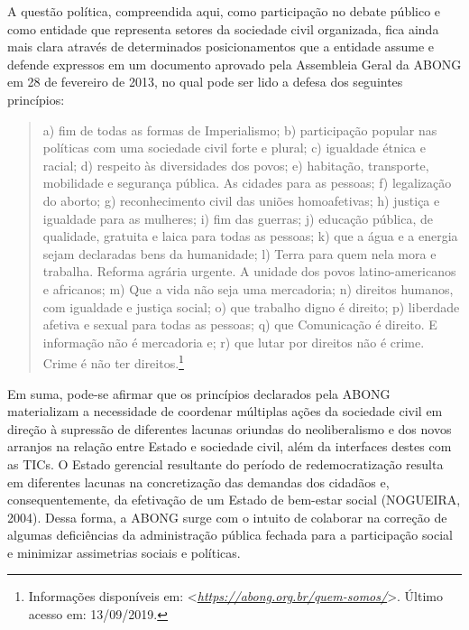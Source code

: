 A questão política, compreendida aqui, como participação no debate
público e como entidade que representa setores da sociedade civil
organizada, fica ainda mais clara através de determinados
posicionamentos que a entidade assume e defende expressos em um
documento aprovado pela Assembleia Geral da ABONG em 28 de fevereiro de
2013, no qual pode ser lido a defesa dos seguintes princípios:

\begin{quote}
a) fim de todas as formas de Imperialismo; b) participação popular nas
políticas com uma sociedade civil forte e plural; c) igualdade étnica e
racial; d) respeito às diversidades dos povos; e) habitação, transporte,
mobilidade e segurança pública. As cidades para as pessoas; f)
legalização do aborto; g) reconhecimento civil das uniões homoafetivas;
h) justiça e igualdade para as mulheres; i) fim das guerras; j) educação
pública, de qualidade, gratuita e laica para todas as pessoas; k) que a
água e a energia sejam declaradas bens da humanidade; l) Terra para quem
nela mora e trabalha. Reforma agrária urgente. A unidade dos povos
latino-americanos e africanos; m) Que a vida não seja uma mercadoria; n)
direitos humanos, com igualdade e justiça social; o) que trabalho digno
é direito; p) liberdade afetiva e sexual para todas as pessoas; q) que
Comunicação é direito. E informação não é mercadoria e; r) que lutar por
direitos não é crime. Crime é não ter direitos.\footnote{Informações
  disponíveis em:
  \textless{}\href{https://abong.org.br/quem-somos/}{\emph{https://abong.org.br/quem-somos/}}\textgreater{}.
  Último acesso em: 13/09/2019.}
\end{quote}

Em suma, pode-se afirmar que os princípios declarados pela ABONG
materializam a necessidade de coordenar múltiplas ações da sociedade
civil em direção à supressão de diferentes lacunas oriundas do
neoliberalismo e dos novos arranjos na relação entre Estado e sociedade
civil, além da interfaces destes com as TICs. O Estado gerencial
resultante do período de redemocratização resulta em diferentes lacunas
na concretização das demandas dos cidadãos e, consequentemente, da
efetivação de um Estado de bem-estar social (NOGUEIRA, 2004). Dessa
forma, a ABONG surge com o intuito de colaborar na correção de algumas
deficiências da administração pública fechada para a participação social
e minimizar assimetrias sociais e políticas.

